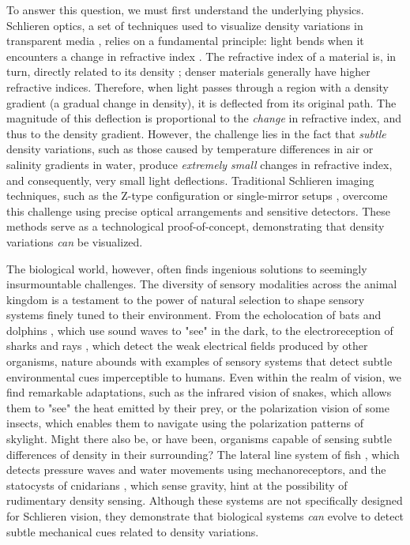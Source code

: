\documentclass[11pt]{article}
\begin{document}
To answer this question, we must first understand the underlying physics. Schlieren optics, a set of techniques used to visualize density variations in transparent media \cite{Settles2001Schlieren}, relies on a fundamental principle: light bends when it encounters a change in refractive index \cite{Hecht2017Optics}. The refractive index of a material is, in turn, directly related to its density \cite{Gladstone1863Refraction, Hecht2017Optics}; denser materials generally have higher refractive indices. Therefore, when light passes through a region with a density gradient (a gradual change in density), it is deflected from its original path. The magnitude of this deflection is proportional to the \textit{change} in refractive index, and thus to the density gradient. However, the challenge lies in the fact that \textit{subtle} density variations, such as those caused by temperature differences in air or salinity gradients in water, produce \textit{extremely small} changes in refractive index, and consequently, very small light deflections. Traditional Schlieren imaging techniques, such as the Z-type configuration or single-mirror setups \cite{Settles2001Schlieren}, overcome this challenge using precise optical arrangements and sensitive detectors. These methods serve as a technological proof-of-concept, demonstrating that density variations \textit{can} be visualized.

The biological world, however, often finds ingenious solutions to seemingly insurmountable challenges. The diversity of sensory modalities across the animal kingdom is a testament to the power of natural selection to shape sensory systems finely tuned to their environment. From the echolocation of bats and dolphins \cite{Au1993DolphinSonar}, which use sound waves to "see" in the dark, to the electroreception of sharks and rays \cite{Bullock2005Electroreception}, which detect the weak electrical fields produced by other organisms, nature abounds with examples of sensory systems that detect subtle environmental cues imperceptible to humans. Even within the realm of vision, we find remarkable adaptations, such as the infrared vision of snakes, which allows them to "see" the heat emitted by their prey, or the polarization vision of some insects, which enables them to navigate using the polarization patterns of skylight. Might there also be, or have been, organisms capable of sensing subtle differences of density in their surrounding? The lateral line system of fish \cite{Dijkgraaf1963LateralLine}, which detects pressure waves and water movements using mechanoreceptors, and the statocysts of cnidarians \cite{Budelmann1992InvertebrateHearing}, which sense gravity, hint at the possibility of rudimentary density sensing. Although these systems are not specifically designed for Schlieren vision, they demonstrate that biological systems \textit{can} evolve to detect subtle mechanical cues related to density variations.
\end{document}
